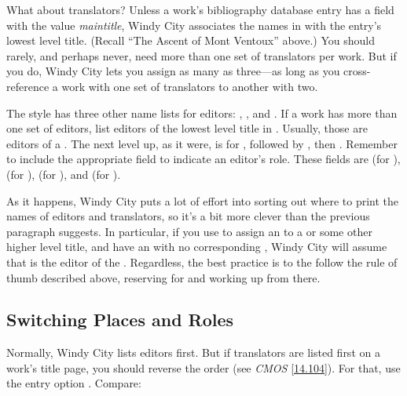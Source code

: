 \documentclass[11pt,letterpaper,oneside]{article}
\begin{document}
What about translators? Unless a work's bibliography database entry
has a  field with the value
\textit{maintitle}, Windy City associates the names in
 with the entry's lowest level title. (Recall
``The Ascent of Mont Ventoux'' above.) You should rarely, and perhaps
never, need more than one set of translators per work. But if you do,
Windy City lets you assign as many as three---as long as you
cross-reference a work with one set of translators to another with
two.

The style has three other name lists for editors: ,
, and . If a work has more than
one set of editors, list editors of the lowest level title in
. Usually, those are editors of a .
The next level up, as it were, is for , followed by
, then . Remember to include the
appropriate  field to indicate an editor's role. These
fields are  (for ),
 (for ),
 (for ), and
 (for ).

As it happens, Windy City puts a lot of effort into sorting out where
to print the names of editors and translators, so it's a bit more
clever than the previous paragraph suggests. In particular, if you use
 to assign an  to a
 or some other higher level title, and have an
 with no corresponding , Windy
City will assume that  is the editor of the
. Regardless, the best practice is to the follow the rule
of thumb described above, reserving  for
 and working up from there.

\subsection{Switching Places and Roles}
\label{edtranspos}

Normally, Windy City lists editors first. But if translators are
listed first on a work's title page, you should reverse the order (see
\textit{CMOS} \ref{14.104}). For that, use the entry option
. Compare:

\begin{citebib}
\item \cite{doe2010a}
\end{citebib}
\begin{citebib}
\item \cite{doe2010b}
\end{citebib}
\end{document}
